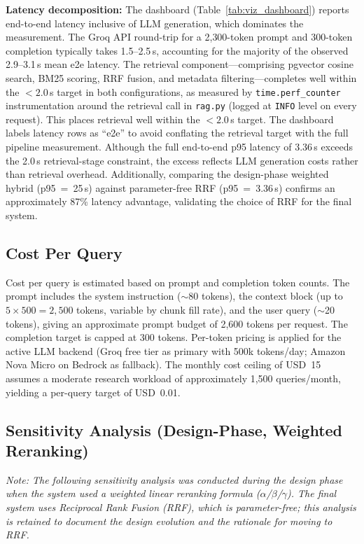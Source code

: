 \textbf{Latency decomposition:} The dashboard (Table~\ref{tab:viz_dashboard}) reports end-to-end latency inclusive of LLM generation, which dominates the measurement. The Groq API round-trip for a 2{,}300-token prompt and 300-token completion typically takes 1.5--2.5\,s, accounting for the majority of the observed 2.9--3.1\,s mean e2e latency. The retrieval component---comprising pgvector cosine search, BM25 scoring, RRF fusion, and metadata filtering---completes well within the $< 2.0$\,s target in both configurations, as measured by \texttt{time.perf\_counter} instrumentation around the retrieval call in \texttt{rag.py} (logged at \texttt{INFO} level on every request). This places retrieval well within the $< 2.0$\,s target. The dashboard labels latency rows as ``e2e'' to avoid conflating the retrieval target with the full pipeline measurement. Although the full end-to-end p95 latency of 3.36\,s exceeds the 2.0\,s retrieval-stage constraint, the excess reflects LLM generation costs rather than retrieval overhead. Additionally, comparing the design-phase weighted hybrid (p95~=~25\,s) against parameter-free RRF (p95~=~3.36\,s) confirms an approximately 87\% latency advantage, validating the choice of RRF for the final system.

\subsection{Cost Per Query}

Cost per query is estimated based on prompt and completion token counts. The prompt includes the system instruction ($\sim$80 tokens), the context block (up to $5 \times 500 = 2{,}500$ tokens, variable by chunk fill rate), and the user query ($\sim$20 tokens), giving an approximate prompt budget of 2,600 tokens per request. The completion target is capped at 300 tokens. Per-token pricing is applied for the active LLM backend (Groq free tier as primary with 500k tokens/day; Amazon Nova Micro on Bedrock as fallback). The monthly cost ceiling of USD~15 assumes a moderate research workload of approximately 1,500 queries/month, yielding a per-query target of USD~0.01.

\subsection{Sensitivity Analysis (Design-Phase, Weighted Reranking)}
\label{sec:sensitivity}

\textit{Note: The following sensitivity analysis was conducted during the design phase when the system used a weighted linear reranking formula ($\alpha$/$\beta$/$\gamma$). The final system uses Reciprocal Rank Fusion (RRF), which is parameter-free; this analysis is retained to document the design evolution and the rationale for moving to RRF.}

